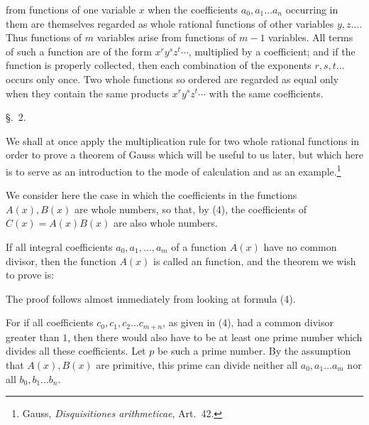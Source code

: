 from functions of one variable $x$ when the coefficients
$a_0,a_1\ldots a_n$ occurring in them are themselves regarded as
whole rational functions of other variables $y,z\ldots$. Thus
functions of $m$ variables arise from functions of $m-1$ variables.
All terms of such a function are of the form $x^r y^s z^t\cdots$,
multiplied by a coefficient; and if the function is properly
collected, then each combination of the exponents $r,s,t\ldots$
occurs only once. Two whole functions so ordered are regarded as equal
only when they contain the same products $x^r y^s z^t\cdots$ with the
same coefficients.

\begin{center}
{\large \S.\ 2.}

\vspace{0.5em}
{\large{}}
\end{center}

We shall at once apply the multiplication rule for two whole rational
functions in order to prove a theorem of Gauss which will be useful to
us later, but which here is to serve as an introduction to the mode of
calculation and as an example.\footnote{Gauss, \emph{Disquisitiones
arithmeticae}, Art.~42.}

We consider here the case in which the coefficients in the functions
$A(x),B(x)$ are whole numbers, so that, by (4), the coefficients of
$C(x)=A(x)B(x)$ are also whole numbers.

If all integral coefficients $a_0,a_1,\ldots,a_m$ of a function
$A(x)$ have no common divisor, then the function $A(x)$ is called an
 function, and the theorem we wish to
prove is:


The proof follows almost immediately from looking at formula (4).

For if all coefficients $c_0,c_1,c_2\ldots c_{m+n}$, as given in
(4), had a common divisor greater than $1$, then there would also have
to be at least one prime number which divides all these coefficients.
Let $p$ be such a prime number. By the assumption that $A(x),B(x)$ are
primitive, this prime can divide neither all $a_0,a_1\ldots a_m$ nor
all $b_0,b_1\ldots b_n$.
